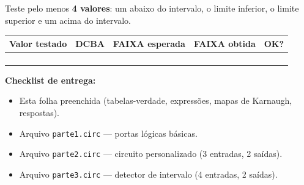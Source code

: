 \documentclass[12pt,a4paper]{article}
\begin{document}

\noindent Teste pelo menos \textbf{4 valores}: um abaixo do intervalo, o limite inferior, o limite superior e um acima do intervalo.

\vspace{4pt}
\noindent
\begin{tabular}{|c|c|c|c|c|}
\hline
\textbf{Valor testado} & \textbf{DCBA} & \textbf{FAIXA esperada} & \textbf{FAIXA obtida} & \textbf{OK?} \\
\hline
\rule{0pt}{16pt}\hspace{20pt} & \hspace{30pt} & \hspace{20pt} & \hspace{20pt} & \hspace{14pt} \\
\hline
\rule{0pt}{16pt}\hspace{20pt} & \hspace{30pt} & \hspace{20pt} & \hspace{20pt} & \hspace{14pt} \\
\hline
\rule{0pt}{16pt}\hspace{20pt} & \hspace{30pt} & \hspace{20pt} & \hspace{20pt} & \hspace{14pt} \\
\hline
\rule{0pt}{16pt}\hspace{20pt} & \hspace{30pt} & \hspace{20pt} & \hspace{20pt} & \hspace{14pt} \\
\hline
\end{tabular}

\vfill
\begin{tcolorbox}[colback=gray!5, colframe=gray!50]
\small
\textbf{Checklist de entrega:}
\begin{itemize}[nosep]
  \item[$\square$] Esta folha preenchida (tabelas-verdade, expressões, mapas de Karnaugh, respostas).
  \item[$\square$] Arquivo \texttt{parte1.circ} --- portas lógicas básicas.
  \item[$\square$] Arquivo \texttt{parte2.circ} --- circuito personalizado (3 entradas, 2 saídas).
  \item[$\square$] Arquivo \texttt{parte3.circ} --- detector de intervalo (4 entradas, 2 saídas).
\end{itemize}
\end{tcolorbox}
\end{document}
